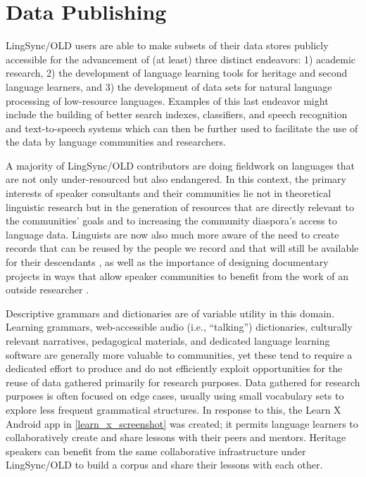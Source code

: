 \documentclass[11pt]{article}
\begin{document}
\section{Data Publishing}
\label{open-data}

LingSync/OLD users are able to make subsets of their data stores publicly
accessible for the advancement of (at least) three distinct endeavors: 1)
academic research, 2) the development of language learning tools for
heritage and second language learners, and 3) the development of data sets for
natural language processing of low-resource languages. Examples of this last
endeavor might include the building of better search indexes, classifiers,
and speech recognition and text-to-speech systems which can then be further
used to facilitate the use of the data by language communities and researchers.

A majority of LingSync/OLD contributors are doing fieldwork on languages that
are not only under-resourced but also endangered. In this context, the primary
interests of speaker consultants and their communities lie not in theoretical
linguistic research but in the generation of resources that are directly
relevant to the communities' goals and to increasing the community diaspora's
access to language data. Linguists are now also much more aware of the need to
create records that can be reused by the people we record and that will still be
available for their descendants \cite[p.129]{Thieberger:2012}, as well as the
importance of designing documentary projects in ways that allow speaker
communities to benefit from the work of an outside researcher \cite{Good:2012}.

Descriptive grammars and dictionaries are of variable utility in this domain.
Learning grammars, web-accessible audio (i.e., ``talking'') dictionaries,
culturally relevant narratives, pedagogical materials, and dedicated language
learning software are generally more valuable to communities, yet these tend to
require a dedicated effort to produce and do not efficiently exploit
opportunities for the reuse of data gathered primarily for research purposes. 
Data gathered for research purposes is often focused on edge cases, usually
using small vocabulary sets to explore less frequent grammatical structures.
In response to this, the Learn X Android app in \autoref{learn_x_screenshot}
was created; it permits language learners to collaboratively create and share
lessons with their peers and mentors. Heritage speakers can benefit from the
same collaborative infrastructure under LingSync/OLD to build a corpus and share
their lessons with each other. 
\end{document}
